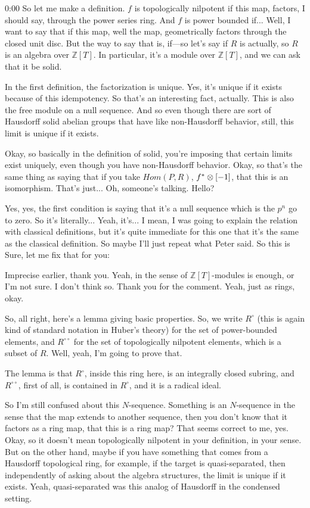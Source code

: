 \begin{unfinished}{0:00}
So let me make a definition. $f$ is topologically nilpotent if this map, factors, I should say, through the power series ring. And $f$ is power bounded if... Well, I want to say that if this map, well the map, geometrically factors through the closed unit disc. But the way to say that is, if---so let's say if $R$ is actually, so $R$ is an algebra over $\mathbb{Z}[T]$. In particular, it's a module over $\mathbb{Z}[T]$, and we can ask that it be solid.

In the first definition, the factorization is unique. Yes, it's unique if it exists because of this idempotency. So that's an interesting fact, actually. This is also the free module on a null sequence. And so even though there are sort of Hausdorff solid abelian groups that have like non-Hausdorff behavior, still, this limit is unique if it exists.

Okay, so basically in the definition of solid, you're imposing that certain limits exist uniquely, even though you have non-Hausdorff behavior. Okay, so that's the same thing as saying that if you take $Hom(P, R)$, $f^* \otimes [-1]$, that this is an isomorphism. That's just... Oh, someone's talking. Hello?

Yes, yes, the first condition is saying that it's a null sequence which is the $p^n$ go to zero. So it's literally... Yeah, it's... I mean, I was going to explain the relation with classical definitions, but it's quite immediate for this one that it's the same as the classical definition. So maybe I'll just repeat what Peter said. So this is
Sure, let me fix that for you:

Imprecise earlier, thank you. Yeah, in the sense of $\mathbb{Z}[T]$-modules is enough, or I'm not sure. I don't think so. Thank you for the comment. Yeah, just as rings, okay.

So, all right, here's a lemma giving basic properties. So, we write $R^{\circ}$ (this is again kind of standard notation in Huber's theory) for the set of power-bounded elements, and $R^{\circ \circ}$ for the set of topologically nilpotent elements, which is a subset of $R$. Well, yeah, I'm going to prove that.

The lemma is that $R^{\circ}$, inside this ring here, is an integrally closed subring, and $R^{\circ \circ}$, first of all, is contained in $R^{\circ}$, and it is a radical ideal.

So I'm still confused about this $N$-sequence. Something is an $N$-sequence in the sense that the map extends to another sequence, then you don't know that it factors as a ring map, that this is a ring map? That seems correct to me, yes. Okay, so it doesn't mean topologically nilpotent in your definition, in your sense. But on the other hand, maybe if you have something that comes from a Hausdorff topological ring, for example, if the target is quasi-separated, then independently of asking about the algebra structures, the limit is unique if it exists. Yeah, quasi-separated was this analog of Hausdorff in the condensed setting.


\end{unfinished}
